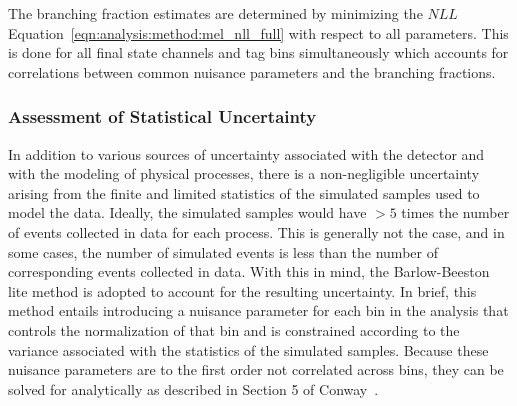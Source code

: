 

The branching fraction estimates are determined by minimizing the $NLL$ Equation~\ref{eqn:analysis:method:mel_nll_full} with respect to all parameters.  This is done for all final state channels and \PQb tag bins simultaneously which accounts for correlations between common nuisance parameters and the \PW branching fractions.

\subsubsection{Assessment of Statistical Uncertainty}
In addition to various sources of uncertainty associated with the detector and with the modeling of physical processes, there is a non-negligible uncertainty arising from the finite and limited statistics of the simulated samples used to model the data.  Ideally, the simulated samples would have $>5$ times the number of events collected in data for each process.  This is generally not the case, and in some cases, the number of simulated events is less than the number of corresponding events collected in data.  With this in mind, the Barlow-Beeston lite method \cite{barlow1993fitting} is adopted to account for the resulting uncertainty.  In brief, this method entails introducing a nuisance parameter for each bin in the analysis that controls the normalization of that bin and is constrained according to the variance associated with the statistics of the simulated samples.  Because these nuisance parameters are to the first order not correlated across bins, they can be solved for analytically as described in Section 5 of Conway~\cite{Conway:2011in}.

